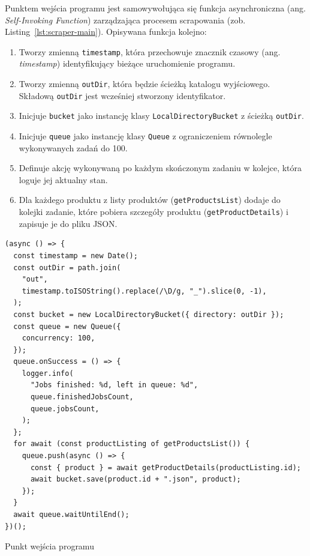 Punktem wejścia programu jest samowywołująca się funkcja asynchroniczna (ang. \emph{Self-Invoking Function}) zarządzająca procesem scrapowania (zob. Listing~\ref{lst:scraper-main}).
Opisywana funkcja kolejno:

\begin{enumerate}
    \item Tworzy zmienną \texttt{timestamp}, która przechowuje znacznik czasowy (ang. \emph{timestamp}) identyfikujący bieżące uruchomienie programu.
    \item Tworzy zmienną \texttt{outDir}, która będzie ścieżką katalogu wyjściowego.
    Składową \texttt{outDir} jest wcześniej stworzony identyfikator.
    \item Inicjuje \texttt{bucket} jako instancję klasy \texttt{LocalDirectoryBucket} z ścieżką \texttt{outDir}.
    \item Inicjuje \texttt{queue} jako instancję klasy \texttt{Queue} z ograniczeniem równolegle wykonywanych zadań do 100.
    \item Definuje akcję wykonywaną po każdym skończonym zadaniu w kolejce, która loguje jej aktualny stan.
    \item Dla każdego produktu z listy produktów (\texttt{getProductsList}) dodaje do kolejki zadanie, które
    pobiera szczegóły produktu (\texttt{getProductDetails}) i zapisuje je do pliku JSON\@.
\end{enumerate}

\begin{listing}[H]
    \begin{verbatim}
(async () => {
  const timestamp = new Date();
  const outDir = path.join(
    "out",
    timestamp.toISOString().replace(/\D/g, "_").slice(0, -1),
  );
  const bucket = new LocalDirectoryBucket({ directory: outDir });
  const queue = new Queue({
    concurrency: 100,
  });
  queue.onSuccess = () => {
    logger.info(
      "Jobs finished: %d, left in queue: %d",
      queue.finishedJobsCount,
      queue.jobsCount,
    );
  };
  for await (const productListing of getProductsList()) {
    queue.push(async () => {
      const { product } = await getProductDetails(productListing.id);
      await bucket.save(product.id + ".json", product);
    });
  }
  await queue.waitUntilEnd();
})();
    \end{verbatim}
    \caption{Punkt wejścia programu}
    \label{lst:scraper-main}
\end{listing}

